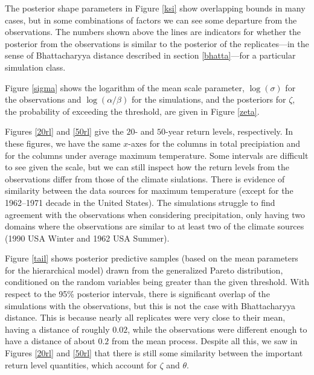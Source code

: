 The posterior shape parameters in Figure \ref{ksi} show overlapping bounds in many cases, but in some combinations of factors we can see some departure from the observations. The numbers shown above the lines are indicators for whether the posterior from the observations is similar to the posterior of the replicates---in the sense of Bhattacharyya distance described in section \ref{bhatta}---for a particular simulation class.

Figure \ref{sigma} shows the logarithm of the mean scale parameter, $\log(\sigma)$ for the observations and $\log(\alpha/\beta)$ for the simulations, and the posteriors for $\zeta$, the probability of exceeding the threshold, are given in Figure \ref{zeta}.

Figures \ref{20rl} and \ref{50rl} give the $20$- and $50$-year return levels, respectively. In these figures, we have the same $x$-axes for the columns in total precipiation and for the columns under average maximum temperature. Some intervals are difficult to see given the scale, but we can still inspect how the return levels from the observations differ from those of the climate siulations. There is evidence of similarity between the data sources for maximum temperature (except for the 1962--1971 decade in the United States). The simulations struggle to find agreement with the observations when considering precipitation, only having two domains where the observations are similar to at least two of the climate sources (1990 USA Winter and 1962 USA Summer).

Figure \ref{tail} shows posterior predictive samples (based on the mean parameters for the hierarchical model) drawn from the generalized Pareto distribution, conditioned on the random variables being greater than the given threshold. With respect to the 95\% posterior intervals, there is significant overlap of the simulations with the observations, but this is not the case with Bhattacharyya distance. This is because nearly all replicates were very close to their mean, having a distance of roughly $0.02$, while the observations were different enough to have a distance of about $0.2$ from the mean process. Despite all this, we saw in Figures \ref{20rl} and \ref{50rl} that there is still some similarity between the important return level quantities, which account for $\zeta$ and $\theta$.

